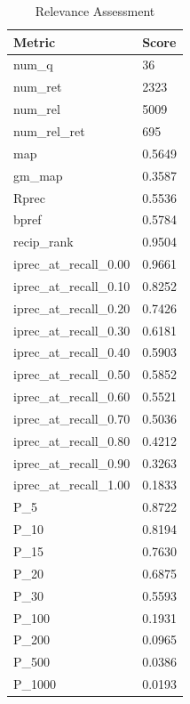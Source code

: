 \begin{table}[htb]
{\begin{tabular}{ | l | l | }
    \hline
    Metric & Score \\ \hline
	num\_q & 36 \\ \hline
	num\_ret & 2323 \\ \hline
	num\_rel & 5009 \\ \hline
	num\_rel\_ret & 695 \\ \hline
	map & 0.5649 \\ \hline
	gm\_map & 0.3587 \\ \hline
	Rprec & 0.5536 \\ \hline
	bpref & 0.5784 \\ \hline
	recip\_rank & 0.9504 \\ \hline
	iprec\_at\_recall\_0.00 & 0.9661 \\ \hline
	iprec\_at\_recall\_0.10 & 0.8252 \\ \hline
	iprec\_at\_recall\_0.20 & 0.7426 \\ \hline
	iprec\_at\_recall\_0.30 & 0.6181 \\ \hline
	iprec\_at\_recall\_0.40 & 0.5903 \\ \hline
	iprec\_at\_recall\_0.50 & 0.5852 \\ \hline
	iprec\_at\_recall\_0.60 & 0.5521 \\ \hline
	iprec\_at\_recall\_0.70 & 0.5036 \\ \hline
	iprec\_at\_recall\_0.80 & 0.4212 \\ \hline
	iprec\_at\_recall\_0.90 & 0.3263 \\ \hline
	iprec\_at\_recall\_1.00 & 0.1833 \\ \hline
	P\_5 & 0.8722 \\ \hline
	P\_10 & 0.8194 \\ \hline
	P\_15 & 0.7630 \\ \hline
	P\_20 & 0.6875 \\ \hline
	P\_30 & 0.5593 \\ \hline
	P\_100 & 0.1931 \\ \hline
	P\_200 & 0.0965 \\ \hline
	P\_500 & 0.0386 \\ \hline
	P\_1000 & 0.0193 \\ \hline
    \end{tabular}
    \caption{Relevance Assessment}
    \label{table:manual-assessment}
    }
\end{table}

